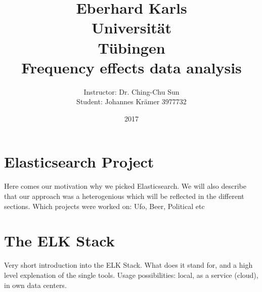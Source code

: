 \documentclass[bibliography=totoc]{article}
\title{Eberhard Karls\\ Universität\\ Tübingen \vspace{1em}\\Frequency effects data analysis}
\author{Instructor: Dr. Ching-Chu Sun\\Student: Johannes Krämer 3977732}
\date{2017}
\begin{document}
\maketitle

\section{Elasticsearch Project}
Here comes our motivation why we picked Elasticsearch.
We will also describe that our approach was a heterogenious which will be reflected in the different sections. 
Which projects were worked on: Ufo, Beer, Political etc

\section{The ELK Stack}
Very short introduction into the ELK Stack. What does it stand for, and a high level explenation of the single tools.
Usage possibilities: local, as a service (cloud), in own data centers.
\end{document}
